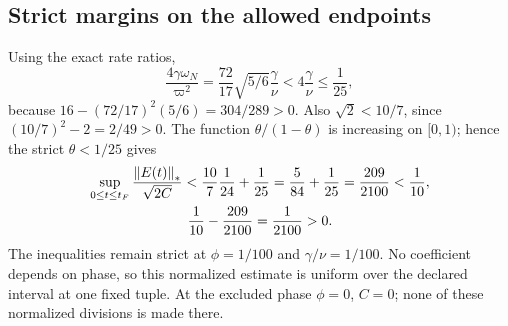 \subsection{Strict margins on the allowed endpoints}\label{sec:strict}
Using the exact rate ratios,
\[
 \frac{4\gamma\omega_N}{\varpi^2}
 =\frac{72}{17}\sqrt{5/6}\frac{\gamma}{\nu}
 <4\frac{\gamma}{\nu}\le\frac1{25},
\]
because $16-(72/17)^2(5/6)=304/289>0$. Also $\sqrt2<10/7$, since
$(10/7)^2-2=2/49>0$. The function $\theta/(1-\theta)$ is increasing on $[0,1)$; hence the strict $\theta<1/25$ gives
\begin{equation}\label{eq:strictbound}%
\begin{gathered}
 \sup_{0\le t\le t_F}\frac{\norm{E(t)}_*}{\sqrt{2C}}
 <\frac{10}{7}\frac1{24}+\frac1{25}
 =\frac5{84}+\frac1{25}
 =\frac{209}{2100}<\frac1{10},\\
 \frac1{10}-\frac{209}{2100}=\frac1{2100}>0 .
\end{gathered}
\end{equation}
The inequalities remain strict at $\phi=1/100$ and $\gamma/\nu=1/100$.
No coefficient depends on phase, so this normalized estimate is uniform over the declared interval at one fixed tuple. At the excluded phase $\phi=0$, $C=0$; none of these normalized divisions is made there.
